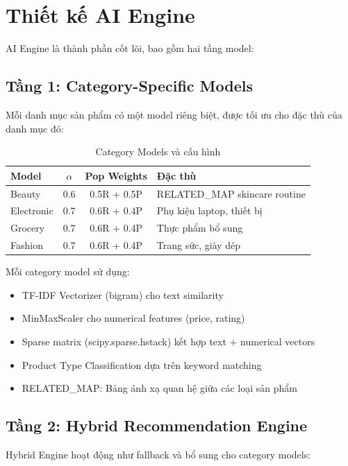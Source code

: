 \documentclass[12pt,a4paper]{report}
\begin{document}
\section{Thiết kế AI Engine}

AI Engine là thành phần cốt lõi, bao gồm hai tầng model:

\subsection{Tầng 1: Category-Specific Models}

Mỗi danh mục sản phẩm có một model riêng biệt, được tối ưu cho đặc thù của danh mục đó:

\begin{table}[H]
\centering
\caption{Category Models và cấu hình}
\label{tab:category_models}
\begin{tabular}{lccl}
\toprule
\textbf{Model} & \textbf{$\alpha$} & \textbf{Pop Weights} & \textbf{Đặc thù} \\
\midrule
Beauty & 0.6 & 0.5R + 0.5P & RELATED\_MAP skincare routine \\
Electronic & 0.7 & 0.6R + 0.4P & Phụ kiện laptop, thiết bị \\
Grocery & 0.7 & 0.6R + 0.4P & Thực phẩm bổ sung \\
Fashion & 0.7 & 0.6R + 0.4P & Trang sức, giày dép \\
\bottomrule
\end{tabular}
\end{table}

Mỗi category model sử dụng:
\begin{itemize}
    \item TF-IDF Vectorizer (bigram) cho text similarity
    \item MinMaxScaler cho numerical features (price, rating)
    \item Sparse matrix (scipy.sparse.hstack) kết hợp text + numerical vectors
    \item Product Type Classification dựa trên keyword matching
    \item RELATED\_MAP: Bảng ánh xạ quan hệ giữa các loại sản phẩm
\end{itemize}

\subsection{Tầng 2: Hybrid Recommendation Engine}

Hybrid Engine hoạt động như fallback và bổ sung cho category models:
\end{document}
